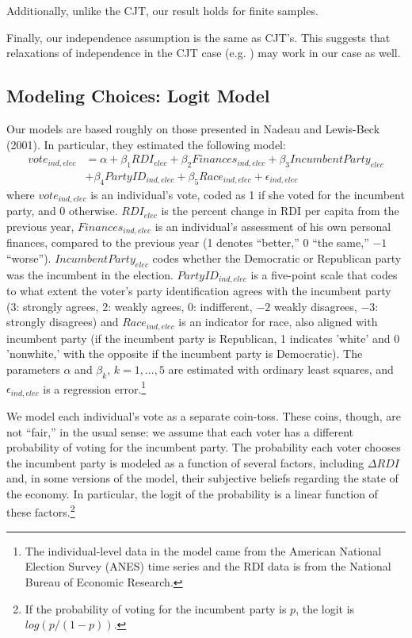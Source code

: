 \documentclass[11pt]{article}
\begin{document}
Additionally, unlike the CJT, our result holds for finite samples.

Finally, our independence assumption is the same as CJT's.
This suggests that relaxations of independence in the CJT case
(e.g. \cite{boland1989modelling}) may work in our case as well.



\subsection{Modeling Choices: Logit Model}
Our models are based roughly on those presented in Nadeau and Lewis-Beck (2001). In particular, they estimated the following model:
\begin{align*}
  vote_{ind,elec}&=\alpha+\beta_1 RDI_{elec}+\beta_2 Finances_{ind,elec} +\beta_3 IncumbentParty_{elec}\\
  &+\beta_4 PartyID_{ind,elec}+\beta_5 Race_{ind,elec}+\epsilon_{ind,elec}
\end{align*}
where $vote_{ind,elec}$ is an individual's vote, coded as 1 if she voted for the incumbent party, and 0 otherwise. $RDI_{elec}$ is the percent change in RDI per capita from the previous year, $Finances_{ind,elec}$ is an individual's assessment of his own personal finances, compared to the previous year (1 denotes
``better,'' 0 ``the same,'' $-1$ ``worse''). $IncumbentParty_{elec}$ codes whether the Democratic or Republican
party was the incumbent in the election. $PartyID_{ind,elec}$ is a five-point scale that codes to what extent
the voter's party identification agrees with the incumbent party (3: strongly agrees, 2: weakly agrees, 0: indifferent, $-2$ weakly disagrees, $-3$: strongly disagrees) and $Race_{ind,elec}$ is an indicator for race, also aligned with incumbent party (if the incumbent party is Republican, 1 indicates 'white' and 0 'nonwhite,' with the opposite if the incumbent party is Democratic). The parameters $\alpha$ and $\beta_k$, $k=1,...,5$ are estimated with ordinary least squares, and $\epsilon_{ind,elec}$ is a regression error.\footnote{The individual-level data in the model came from the American National
Election Survey (ANES) time series \cite{ANES} and the RDI data is from the National Bureau of Economic Research.}

We model each individual's vote as a separate coin-toss.
These coins, though, are not ``fair,'' in the usual sense: we assume that each voter has a different probability of voting for the incumbent party.
The probability each voter chooses the incumbent party is modeled as a function of several factors, including $\Delta RDI$ and, in some versions of the model, their subjective beliefs regarding the state of the economy.
In particular, the logit of the probability is a linear function of these factors.\footnote{If the probability of voting for the incumbent party is $p$, the logit is $log(p/(1-p))$.}
\end{document}
